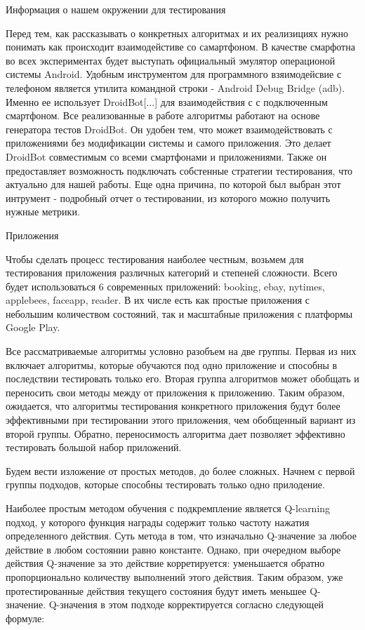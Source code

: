 Информация о нашем окружении для тестирования

Перед тем, как рассказывать о конкретных алгоритмах и их реализициях нужно понимать как происходит взаимодейстиве со самартфоном. В качестве смарфотна во всех экспериментах будет выступать официальный эмулятор операционой системы Android. Удобным инструментом для программного взяимодейсвие с телефоном является утилита командной строки - Android Debug Bridge (adb). Именно ее использует DroidBot[...] для взаимодействия с с подключенным смартфоном. Все реализованные в работе алгоритмы работают на основе генератора тестов DroidBot. Он удобен тем, что может взаимодействовать с приложениями без модификации системы и самого приложения. Это делает DroidBot совместимым со всеми смартфонами и приложениями. Также он предоставляет возможность подключать собстенные стратегии тестирования, что актуально для нашей работы. Еще одна причина, по которой был выбран этот интрумент - подробный отчет о тестировании, из которого можно получить нужные метрики.



Приложения

Чтобы сделать процесс тестирования наиболее честным, возьмем для тестирования приложения различных категорий и степеней сложности. Всего будет использоваться 6 современных приложений:  booking, ebay, nytimes, applebees, faceapp, reader. В их числе есть как простые приложения с небольшим количеством состояний, так и масштабные приложения с платформы Google Play. 




Все рассматриваемые алгоритмы условно разобъем на две группы. Первая из них включает алгоритмы, которые обучаются под одно приложение и способны в последствии тестировать только его. Вторая группа алгоритмов может обобщать и переносить свои методы между от приложения к приложению. Таким образом, ожидается, что алгоритмы тестирования конкретного приложения будут более эффективными при тестировании этого приложения, чем обобщенный вариант из второй группы. Обратно, переносимость алгоритма дает позволяет эффективно тестировать большой набор приложений.

Будем вести изложение от простых методов, до более сложных. Начнем с первой группы подходов, которые способны тестировать только одно прилодение.

Наиболее простым методом обучения с подкремпление является Q-learning подход, у которого функция награды содержит только частоту нажатия определенного действия. Суть метода в том, что изначально Q-значение за любое действие в любом состоянии равно константе. Однако, при очередном выборе действия Q-значение за это действие корретируется: уменьшается обратно пропорционально количеству выполнений этого действия. Таким образом, уже протестированные действия текущего состояния будут иметь меньшее Q-значение. Q-значения в этом подходе корректируется согласно следующей формуле:

